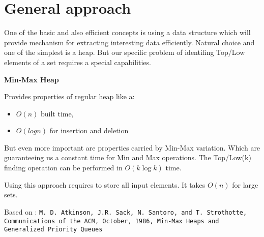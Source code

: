 \section*{General approach}
One of the basic and also efficient concepts is using a data structure which
will provide mechanism for extracting interesting data efficiently. 
Natural choice and one of the simplest is a heap. But our specific problem of 
identifing Top/Low elements of a set requires a special capabilities.

\noindent \textbf{Min-Max Heap}

Provides properties of regular heap like a: 
\begin{itemize}
\item $O(n)$ built time,
\item $O(log{}n)$ for insertion and deletion
\end{itemize}

But even more important are properties carried by Min-Max variation. Which are 
guaranteeing us a constant time for Min and Max operations. The Top/Low(k) 
finding operation can be performed in $O(k\log{}k)$ time.

Using this approach requires to store all input elements. It takes $O(n)$ for 
large sets.

Based on : \texttt{M. D. Atkinson, J.R. Sack, N. Santoro, and T. Strothotte, 
Communications of the ACM, 
October, 1986, 
Min-Max Heaps and Generalized Priority Queues}